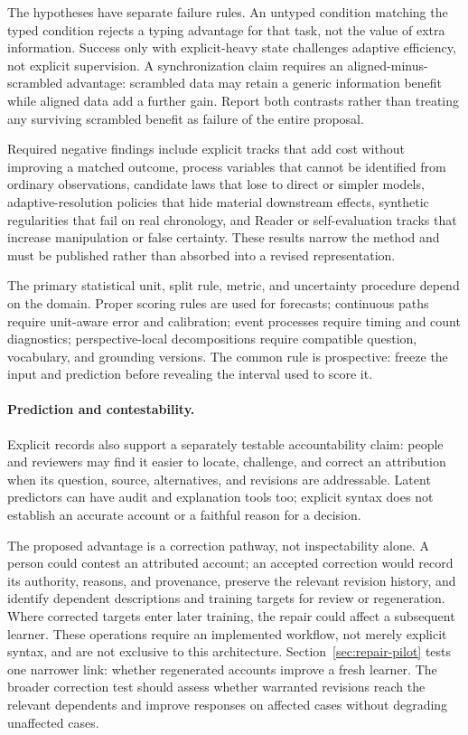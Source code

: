\documentclass[10pt]{article}
\begin{document}
The hypotheses have separate
failure rules. An untyped condition matching the typed condition rejects a
typing advantage for that task, not the value of extra information. Success
only with explicit-heavy state challenges adaptive efficiency, not explicit
supervision. A synchronization claim requires an aligned-minus-scrambled
advantage: scrambled data may retain a generic information benefit while
aligned data add a further gain. Report both contrasts rather than treating
any surviving scrambled benefit as failure of the entire proposal.

Required negative findings include explicit tracks that add cost without
improving a matched outcome, process variables that cannot be identified from
ordinary observations, candidate laws that lose to direct or simpler models,
adaptive-resolution policies that hide material downstream effects, synthetic
regularities that fail on real chronology, and Reader or self-evaluation tracks
that increase manipulation or false certainty. These results narrow the method
and must be published rather than absorbed into a revised representation.

The primary statistical unit, split rule, metric, and uncertainty procedure
depend on the domain. Proper scoring rules are used for forecasts; continuous
paths require unit-aware error and calibration; event processes require timing
and count diagnostics; perspective-local decompositions require compatible
question, vocabulary, and grounding versions. The common rule is prospective:
freeze the input and prediction before revealing the interval used to score it.

\paragraph{Prediction and contestability.}
Explicit records also support a separately testable accountability claim:
people and reviewers may find it easier to locate, challenge, and correct an
attribution when its question, source, alternatives, and revisions are
addressable. Latent predictors can have audit and explanation tools too;
explicit syntax does not establish an accurate account or a faithful reason
for a decision.

The proposed advantage is a correction pathway, not inspectability alone. A
person could contest an attributed account; an accepted correction would record
its authority, reasons, and provenance, preserve the relevant revision history,
and identify dependent descriptions and training targets for review or
regeneration. Where corrected targets enter later training, the repair could
affect a subsequent learner. These operations require an implemented workflow,
not merely explicit syntax, and are not exclusive to this architecture.
Section~\ref{sec:repair-pilot} tests one narrower link: whether regenerated
accounts improve a fresh learner. The broader correction test should assess
whether warranted revisions reach the relevant dependents and improve responses
on affected cases without degrading unaffected cases.
\end{document}
